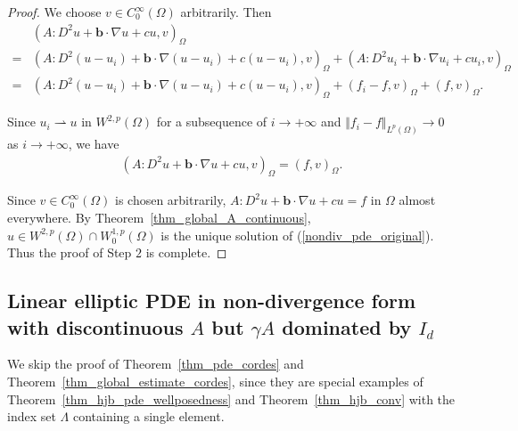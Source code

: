 \documentclass[12pt]{amsart}
\theoremstyle{definition}
\theoremstyle{remark}
\begin{document}
\begin{proof}
We choose $v \in C_{0}^{\infty}(\Omega)$ arbitrarily. Then 
\begin{align*}
& (A:D^{2} u + \boldsymbol{b}\cdot \nabla u + cu, v)_{\Omega} \\
= & (A:D^{2}(u - u_{i}) + \boldsymbol{b}\cdot \nabla (u - u_{i}) 
+ c(u - u_{i}), v)_{\Omega} 
+ (A:D^{2}u_{i} + \boldsymbol{b}\cdot\nabla u_{i} + c u_{i}, v)_{\Omega} \\
= & (A:D^{2}(u - u_{i}) + \boldsymbol{b}\cdot \nabla (u - u_{i}) 
+ c(u - u_{i}), v)_{\Omega} + (f_{i} - f, v)_{\Omega}
+ (f, v)_{\Omega}. 
\end{align*}

Since $u_{i} \rightharpoonup u \text{ in } W^{2,p}(\Omega)$ for 
a subsequence of $i \rightarrow + \infty$ and 
$\Vert f_{i} - f \Vert_{L^{p}(\Omega)} \rightarrow 0$ as 
$i \rightarrow + \infty$, we have 
\begin{align*}
(A:D^{2} u + \boldsymbol{b}\cdot \nabla u 
+ c u, v)_{\Omega} = (f, v)_{\Omega}.
\end{align*}

Since $v \in C_{0}^{\infty}(\Omega)$ is chosen arbitrarily, 
$A:D^{2}u +  \boldsymbol{b}\cdot \nabla u + c u= f$ in $\Omega$ almost everywhere. 
By Theorem~\ref{thm_global_A_continuous}, 
$u \in W^{2,p}(\Omega)\cap W_{0}^{1,p}(\Omega)$ is the unique solution of 
(\ref{nondiv_pde_original}). Thus the proof of Step $2$ is complete. 
\end{proof}

\subsection{Linear elliptic PDE in non-divergence form with discontinuous $A$ but $\gamma A$ dominated by $I_{d}$}

We skip the proof of Theorem~\ref{thm_pde_cordes} and Theorem~\ref{thm_global_estimate_cordes}, since they are 
special examples of Theorem~\ref{thm_hjb_pde_wellposedness} and Theorem~\ref{thm_hjb_conv}  
with the index set $\Lambda$ containing a single element. 
\end{document}
